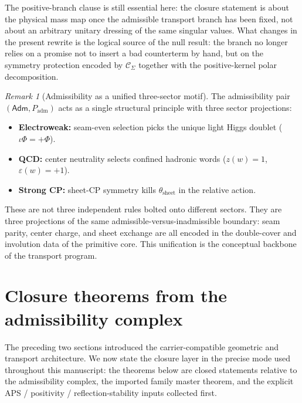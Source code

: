 \documentclass[11pt,a4paper]{article}
\theoremstyle{definition}
\theoremstyle{remark}
\newtheorem*{remark}{Remark}
\newcommand{\inv}{\iota}
\newcommand{\Padm}{P_{\mathrm{adm}}}
\begin{document}
The positive-branch clause is still essential here: the closure statement is about the physical mass map once the admissible transport branch has been fixed, not about an arbitrary unitary dressing of the same singular values. What changes in the present rewrite is the logical source of the null result: the branch no longer relies on a promise not to insert a bad counterterm by hand, but on the symmetry protection encoded by $\mathcal C_\Sigma$ together with the positive-kernel polar decomposition.

\begin{remark}[Admissibility as a unified three-sector motif]
The admissibility pair $(\mathsf{Adm},\Padm)$ acts as a single structural principle with three sector projections:
\begin{itemize}[leftmargin=1.5em, topsep=3pt, itemsep=2pt]
    \item \textbf{Electroweak:} seam-even selection picks the unique light Higgs doublet ($\inv\Phi=+\Phi$).
    \item \textbf{QCD:} center neutrality selects confined hadronic words ($z(w)=1$, $\varepsilon(w)=+1$).
    \item \textbf{Strong CP:} sheet-CP symmetry kills $\theta_{\mathrm{sheet}}$ in the relative action.
\end{itemize}
These are not three independent rules bolted onto different sectors. They are three projections of the same admissible-versus-inadmissible boundary: seam parity, center charge, and sheet exchange are all encoded in the double-cover and involution data of the primitive core. This unification is the conceptual backbone of the transport program.
\end{remark}

\section{Closure theorems from the admissibility complex}
\label{sec:closure-theorems}

The preceding two sections introduced the carrier-compatible geometric and transport architecture. We now state the closure layer in the precise mode used throughout this manuscript: the theorems below are closed statements relative to the admissibility complex, the imported family master theorem, and the explicit APS / positivity / reflection-stability inputs collected first.
\end{document}
